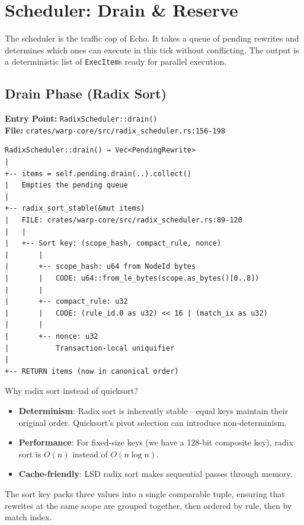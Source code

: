 
\chapter{Scheduler: Drain \& Reserve}
\label{chap:tour-scheduler}

\begin{bigpicture}
The scheduler is the traffic cop of Echo. It takes a queue of pending rewrites and determines which ones can execute in this tick without conflicting. The output is a deterministic list of \texttt{ExecItem}s ready for parallel execution.
\end{bigpicture}

\section{Drain Phase (Radix Sort)}

\textbf{Entry Point:} \texttt{RadixScheduler::drain()} \\
\textbf{File:} \texttt{crates/warp-core/src/radix\_scheduler.rs:156-198}

\begin{verbatim}
RadixScheduler::drain() → Vec<PendingRewrite>
|
+-- items = self.pending.drain(..).collect()
|   Empties the pending queue
|
+-- radix_sort_stable(&mut items)
|   FILE: crates/warp-core/src/radix_scheduler.rs:89-120
|   |
|   +-- Sort key: (scope_hash, compact_rule, nonce)
|       |
|       +-- scope_hash: u64 from NodeId bytes
|       |   CODE: u64::from_le_bytes(scope.as_bytes()[0..8])
|       |
|       +-- compact_rule: u32
|       |   CODE: (rule_id.0 as u32) << 16 | (match_ix as u32)
|       |
|       +-- nonce: u32
|           Transaction-local uniquifier
|
+-- RETURN items (now in canonical order)
\end{verbatim}

\begin{commentary}
Why radix sort instead of quicksort?

\begin{itemize}
    \item \textbf{Determinism}: Radix sort is inherently stable---equal keys maintain their original order. Quicksort's pivot selection can introduce non-determinism.
    \item \textbf{Performance}: For fixed-size keys (we have a 128-bit composite key), radix sort is $O(n)$ instead of $O(n \log n)$.
    \item \textbf{Cache-friendly}: LSD radix sort makes sequential passes through memory.
\end{itemize}

The sort key packs three values into a single comparable tuple, ensuring that rewrites at the same scope are grouped together, then ordered by rule, then by match index.
\end{commentary}

